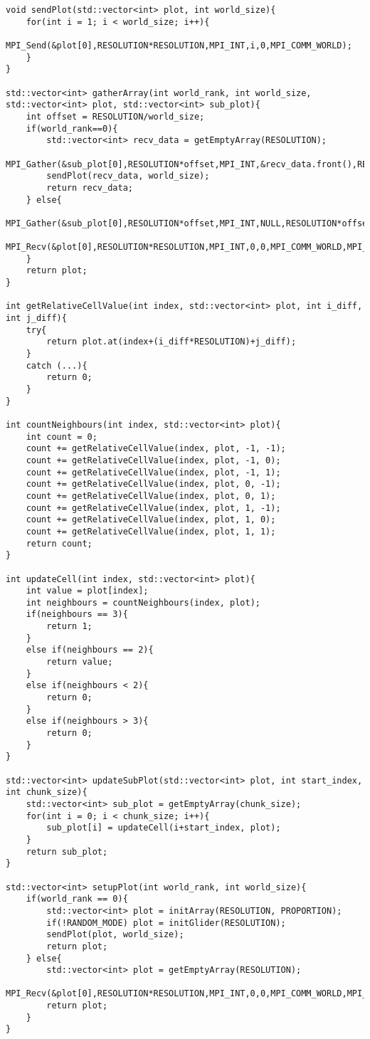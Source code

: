 \documentclass[12pt]{article}
\begin{document}
\begin{verbatim}
void sendPlot(std::vector<int> plot, int world_size){	
	for(int i = 1; i < world_size; i++){
		MPI_Send(&plot[0],RESOLUTION*RESOLUTION,MPI_INT,i,0,MPI_COMM_WORLD);
	}
}

std::vector<int> gatherArray(int world_rank, int world_size, std::vector<int> plot, std::vector<int> sub_plot){
	int offset = RESOLUTION/world_size;
	if(world_rank==0){
		std::vector<int> recv_data = getEmptyArray(RESOLUTION);
		MPI_Gather(&sub_plot[0],RESOLUTION*offset,MPI_INT,&recv_data.front(),RESOLUTION*offset,MPI_INT,0,MPI_COMM_WORLD);
		sendPlot(recv_data, world_size);
		return recv_data;
	} else{
		MPI_Gather(&sub_plot[0],RESOLUTION*offset,MPI_INT,NULL,RESOLUTION*offset,MPI_INT,0,MPI_COMM_WORLD);
		MPI_Recv(&plot[0],RESOLUTION*RESOLUTION,MPI_INT,0,0,MPI_COMM_WORLD,MPI_STATUS_IGNORE);
	}
	return plot;
}

int getRelativeCellValue(int index, std::vector<int> plot, int i_diff, int j_diff){
	try{
		return plot.at(index+(i_diff*RESOLUTION)+j_diff);
	}
	catch (...){
		return 0;
	}
}

int countNeighbours(int index, std::vector<int> plot){
	int count = 0;
	count += getRelativeCellValue(index, plot, -1, -1);
	count += getRelativeCellValue(index, plot, -1, 0);
	count += getRelativeCellValue(index, plot, -1, 1);
	count += getRelativeCellValue(index, plot, 0, -1);
	count += getRelativeCellValue(index, plot, 0, 1);
	count += getRelativeCellValue(index, plot, 1, -1);
	count += getRelativeCellValue(index, plot, 1, 0);
	count += getRelativeCellValue(index, plot, 1, 1);
	return count;
}

int updateCell(int index, std::vector<int> plot){
	int value = plot[index];
	int neighbours = countNeighbours(index, plot);
	if(neighbours == 3){
		return 1;
	}
	else if(neighbours == 2){
		return value;
	}
	else if(neighbours < 2){
		return 0;
	}
	else if(neighbours > 3){
		return 0;
	}
}

std::vector<int> updateSubPlot(std::vector<int> plot, int start_index, int chunk_size){
	std::vector<int> sub_plot = getEmptyArray(chunk_size);
	for(int i = 0; i < chunk_size; i++){
		sub_plot[i] = updateCell(i+start_index, plot);
	}
	return sub_plot;
}

std::vector<int> setupPlot(int world_rank, int world_size){
	if(world_rank == 0){
		std::vector<int> plot = initArray(RESOLUTION, PROPORTION);
		if(!RANDOM_MODE) plot = initGlider(RESOLUTION);
		sendPlot(plot, world_size);
		return plot;
	} else{
		std::vector<int> plot = getEmptyArray(RESOLUTION);
		MPI_Recv(&plot[0],RESOLUTION*RESOLUTION,MPI_INT,0,0,MPI_COMM_WORLD,MPI_STATUS_IGNORE);
		return plot;
	}
}


\end{verbatim}
\end{document}
